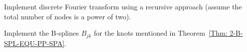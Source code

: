 \begin{problem}
     Implement discrete Fourier transform using a recursive approach (assume the total number of nodes is a power of two).
\end{problem}

\begin{problem}
    Implement the B-splines $B_{jk}$ for the knots mentioned in Theorem~\ref{Thm: 2-B-SPL-EQU-PP-SPA}.
\end{problem}

% 
\nocite{jackson1912approximation, jackson1913accuracy, erdHos1964problems,erdos1958problems,de1978practical,prenter2008splines,trefethen1991two}


